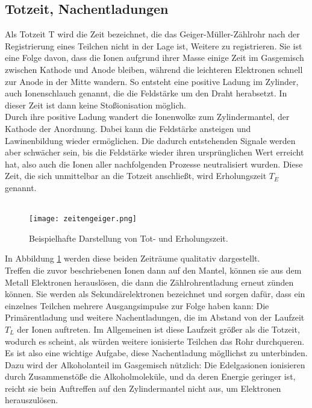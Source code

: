 \subsection{Totzeit, Nachentladungen}
Als Totzeit T wird die Zeit bezeichnet, die das Geiger-Müller-Zählrohr nach
der Registrierung eines Teilchen nicht in der Lage ist, Weitere zu registrieren.
Sie ist eine Folge davon, dass die Ionen aufgrund ihrer Masse einige Zeit im
Gasgemisch zwischen Kathode und Anode bleiben, während die leichteren Elektronen
schnell zur Anode in der Mitte wandern. So entsteht eine positive Ladung im 
Zylinder, auch Ionenschlauch genannt, die die Feldstärke um den Draht herabsetzt.
In dieser Zeit ist dann keine Stoßionisation möglich.\\
Durch ihre positive Ladung wandert die Ionenwolke zum Zylindermantel, der Kathode
der Anordnung. Dabei kann die Feldstärke ansteigen und Lawinenbildung wieder ermöglichen.
Die dadurch entstehenden Signale werden aber schwächer sein, bis die Feldstärke
wieder ihren ursprünglichen Wert erreicht hat, also auch die Ionen aller nachfolgenden
Prozesse neutralisiert wurden. Diese Zeit, die sich unmittelbar an die Totzeit
anschließt, wird Erholungszeit $T_E$ genannt.\\
\\
\begin{figure}
 \centering
 \texttt{[image: zeitengeiger.png]}
 \caption{Beispielhafte Darstellung von Tot- und Erholungszeit.}
 \label{fig:gramm}
\end{figure}
In Abbildung \ref{fig:gramm} werden diese beiden Zeiträume qualitativ dargestellt.\\
Treffen die zuvor beschriebenen Ionen dann auf den Mantel, können sie aus dem
Metall Elektronen herauslösen, die dann die Zählrohrentladung erneut zünden können.
Sie werden als Sekundärelektronen bezeichnet und sorgen dafür, dass ein einzelnes
Teilchen mehrere Ausgangsimpulse zur Folge haben kann: Die Primärentladung und
weitere Nachentladungen, die im Abstand von der Laufzeit $T_L$ der Ionen 
auftreten. Im Allgemeinen ist diese Laufzeit größer als die Totzeit, wodurch es
scheint, als würden weitere ionisierte Teilchen das Rohr durchqueren.\\
Es ist also eine wichtige Aufgabe, diese Nachentladung mögllichst zu unterbinden.
Dazu wird der Alkoholanteil im Gasgemisch nützlich: Die Edelgasionen 
ionisieren durch Zusammenstöße die Alkoholmoleküle, und da deren Energie 
geringer ist, reicht sie bein Auftreffen auf den Zylindermantel nicht aus,
um Elektronen herauszulösen. 

